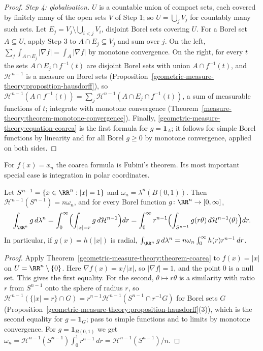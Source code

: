 \begin{proof}
\emph{Step 4: globalisation.} $U$ is a countable union of compact sets, each covered by finitely many of the open sets $V$ of Step 1; so $U = \bigcup_jV_j$ for countably many such sets. Let
$E_j = V_j \setminus \bigcup_{i < j}V_i$, disjoint Borel sets covering $U$. For a Borel set $A \subseteq U$, apply Step 3 to $A \cap E_j \subseteq V_j$ and sum over $j$. On the left,
$\sum_j\int_{A \cap E_j}|\nabla f| = \int_A|\nabla f|$ by monotone convergence. On the right, for every $t$ the sets $A \cap E_j \cap f^{-1}(t)$ are disjoint Borel sets with union
$A \cap f^{-1}(t)$, and $\mathcal{H}^{n-1}$ is a measure on Borel sets (Proposition~\ref{geometric-measure-theory:proposition-hausdorff}), so
$\mathcal{H}^{n-1}(A \cap f^{-1}(t)) = \sum_j\mathcal{H}^{n-1}(A \cap E_j \cap f^{-1}(t))$, a sum of measurable functions of $t$; integrate with monotone convergence
(Theorem~\ref{measure-theory:theorem-monotone-convergence}). Finally, \eqref{geometric-measure-theory:equation-coarea} is the first formula for $g = \mathbf{1}_A$; it follows for simple Borel functions by
linearity and for all Borel $g \geq 0$ by monotone convergence, applied on both sides.
\end{proof}

For $f(x) = x_n$ the coarea formula is Fubini's theorem. Its most important special case is integration in polar coordinates.

\begin{corollary}\label{geometric-measure-theory:corollary-polar}
Let $S^{n-1} = \{x \in \RR^n : |x| = 1\}$ and $\omega_n = \lambda^n(B(0, 1))$. Then $\mathcal{H}^{n-1}(S^{n-1}) = n\omega_n$, and for every Borel function $g \colon \RR^n \to [0, \infty]$,
\[
\int_{\RR^n}g\,d\lambda^n = \int_0^\infty\Bigl(\int_{|x| = r}g\,d\mathcal{H}^{n-1}\Bigr)dr = \int_0^\infty r^{n-1}\Bigl(\int_{S^{n-1}}g(r\theta)\,d\mathcal{H}^{n-1}(\theta)\Bigr)dr .
\]
In particular, if $g(x) = h(|x|)$ is radial, $\int_{\RR^n}g\,d\lambda^n = n\omega_n\int_0^\infty h(r)r^{n-1}\,dr$.
\end{corollary}

\begin{proof}
Apply Theorem~\ref{geometric-measure-theory:theorem-coarea} to $f(x) = |x|$ on $U = \RR^n \setminus \{0\}$. Here $\nabla f(x) = x/|x|$, so $|\nabla f| = 1$, and the point $0$ is a null set. This gives the
first equality. For the second, $\theta \mapsto r\theta$ is a similarity with ratio $r$ from $S^{n-1}$ onto the sphere of radius $r$, so
$\mathcal{H}^{n-1}(\{|x| = r\} \cap G) = r^{n-1}\mathcal{H}^{n-1}(S^{n-1} \cap r^{-1}G)$ for Borel sets $G$ (Proposition~\ref{geometric-measure-theory:proposition-hausdorff}(3)), which is the second equality for
$g = \mathbf{1}_G$; pass to simple functions and to limits by monotone convergence. For $g = \mathbf{1}_{B(0, 1)}$ we get $\omega_n = \mathcal{H}^{n-1}(S^{n-1})\int_0^1r^{n-1}\,dr = \mathcal{H}^{n-1}(S^{n-1})/n$.
\end{proof}


